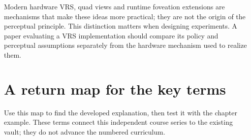 Modern hardware VRS, quad views and runtime foveation extensions are mechanisms that make these ideas more practical; they are not the origin of the perceptual principle. This distinction matters when designing experiments. A paper evaluating a VRS implementation should compare its policy and perceptual assumptions separately from the hardware mechanism used to realize them.

\section{A return map for the key terms}\label{04-visual-computing-ii-ch035-a-return-map-for-the-key-terms}

Use this map to find the developed explanation, then test it with the chapter example. These terms connect this independent course series to the existing vault; they do not advance the numbered curriculum.

